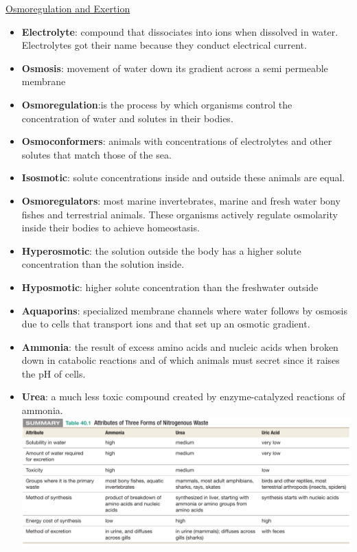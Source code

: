 \documentclass[12pt,letterpaper]{article}
\begin{document}
\hypertarget{40.1}{}
\begin{secbox}{\hyperlink{40}{Osmoregulation and Exertion}}{
    \begin{itemize}
        \item \textbf{Electrolyte}: compound that dissociates into ions when dissolved in water. Electrolytes got their name because they conduct electrical current.        
        \item \textbf{Osmosis}: movement of water down its gradient across a semi­ permeable membrane
        \item \textbf{Osmoregulation}:is the process by which organisms control the concentration of water and solutes in their bodies.
        \item \textbf{Osmoconformers}: animals with concentrations of electrolytes and other solutes that match those of the sea.
        \item \textbf{Isosmotic}: solute concentrations inside and outside these animals are equal.
        \item \textbf{Osmoregulators}: most marine invertebrates, marine and fresh­ water bony fishes and terrestrial animals. These organisms actively regulate osmolarity inside their bodies to achieve homeostasis. 
        \item \textbf{Hyperosmotic}: the solution outside the body has a higher solute concentration than the solution inside.
        \item \textbf{Hyposmotic}: higher solute concentration than the freshwater outside
        \item \textbf{Aquaporins}: specialized membrane channels where water follows by osmosis due to cells that transport ions and that set up an osmotic gradient.
        \item \textbf{Ammonia}: the result of excess amino acids and nucleic acids when broken down in catabolic reactions and of which animals must secret since it raises the pH of cells. 
        \item \textbf{Urea}: a much less toxic compound created by enzyme­-catalyzed reactions of ammonia.
        \includegraphics[width=\linewidth]{images/waste.png}
    \end{itemize}
}\end{secbox}
\end{document}
